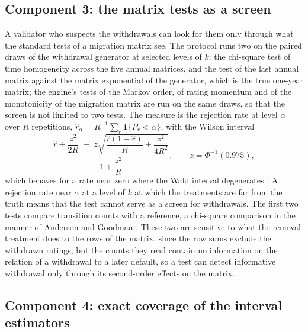 \subsection{Component 3: the matrix tests as a screen}
\label{sec:method-tests}

A validator who suspects the withdrawals can look for them only through what the standard tests of a migration matrix see. The protocol runs two on the paired draws of the withdrawal generator at selected levels of $k$: the chi-square test of time homogeneity across the five annual matrices, and the test of the last annual matrix against the matrix exponential of the generator, which is the true one-year matrix; the engine's tests of the Markov order, of rating momentum and of the monotonicity of the migration matrix are run on the same draws, so that the screen is not limited to two tests. The measure is the rejection rate at level $\alpha$ over $R$ repetitions, $\hat r_\alpha=R^{-1}\sum_r\mathbf 1\{P_r<\alpha\}$, with the Wilson interval
\begin{equation}
\frac{\hat r+\dfrac{z^{2}}{2R}\;\pm\;z\sqrt{\dfrac{\hat r(1-\hat r)}{R}+\dfrac{z^{2}}{4R^{2}}}}{1+\dfrac{z^{2}}{R}},\qquad z=\Phi^{-1}(0.975),
\label{eq:wilson}
\end{equation}
which behaves for a rate near zero where the Wald interval degenerates \citep{Wilson_1927}. A rejection rate near $\alpha$ at a level of $k$ at which the treatments are far from the truth means that the test cannot serve as a screen for withdrawals. The first two tests compare transition counts with a reference, a chi-square comparison in the manner of Anderson and Goodman \citep{Anderson_1957}. These two are sensitive to what the removal treatment does to the rows of the matrix, since the row sums exclude the withdrawn ratings, but the counts they read contain no information on the relation of a withdrawal to a later default, so a test can detect informative withdrawal only through its second-order effects on the matrix. %

\subsection{Component 4: exact coverage of the interval estimators}
\label{sec:method-coverage}

